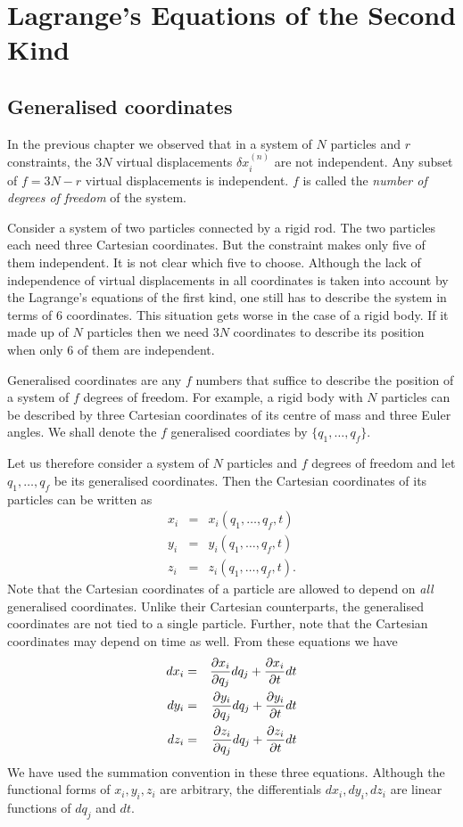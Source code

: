 \chapter{Lagrange's Equations of the Second Kind}\label{c2}
\section{Generalised coordinates}\label{c2s1}
In the previous chapter we observed that in a system of $N$ particles and $r$
constraints, the $3N$ virtual displacements $\delta x^{(n)}_i$ are not 
independent. Any subset of $f = 3N - r$ virtual displacements is independent. 
$f$ is called the \emph{number of degrees of freedom} of the system.

Consider a system of two particles connected by a rigid rod. The two particles
each need three Cartesian coordinates. But the constraint makes only five of
them independent. It is not clear which five to choose. Although the lack of
independence of virtual displacements in all coordinates is taken into account
by the Lagrange's equations of the first kind, one still has to describe the 
system in terms of $6$ coordinates. This situation gets worse in the case of
a rigid body. If it made up of $N$ particles then we need $3N$ coordinates to
describe its position when only $6$ of them are independent.

Generalised coordinates are any $f$ numbers that suffice to describe the
position of a system of $f$ degrees of freedom. For example, a rigid body
with $N$ particles can be described by three Cartesian coordinates of its
centre of mass and three Euler angles. We shall denote the $f$ generalised
coordiates by $\{q_1, \ldots, q_f\}$.

Let us therefore consider a system of $N$ particles and $f$ degrees of freedom
and let $q_1, \ldots, q_f$ be its generalised coordinates. Then the Cartesian
coordinates of its particles can be written as
\begin{eqnarray}
x_i &=& x_i(q_1, \ldots, q_f, t) \\
y_i &=& y_i(q_1, \ldots, q_f, t) \\
z_i &=& z_i(q_1, \ldots, q_f, t).
\end{eqnarray}
Note that the Cartesian coordinates of a particle are allowed to depend on 
\emph{all} generalised coordinates. Unlike their Cartesian counterparts, the
generalised coordinates are not tied to a single particle. Further, note that
the Cartesian coordinates may depend on time as well. From these equations
we have
\begin{eqnarray}
dx_i &=& \frac{\partial{x_i}}{\partial{q_j}}dq_j + \frac{\partial{x_i}}{\partial{t}}dt \\
dy_i &=& \frac{\partial{y_i}}{\partial{q_j}}dq_j + \frac{\partial{y_i}}{\partial{t}}dt \\
dz_i &=& \frac{\partial{z_i}}{\partial{q_j}}dq_j + \frac{\partial{z_i}}{\partial{t}}dt
\end{eqnarray}
We have used the summation convention in these three equations. Although
the functional forms of $x_i, y_i, z_i$ are arbitrary, the differentials
$dx_i, dy_i, dz_i$ are linear functions of $dq_j$ and $dt$.

